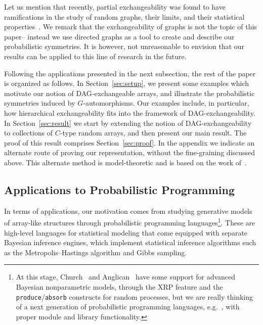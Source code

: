 \documentclass[10pt]{amsart}
\theoremstyle{definition}\newtheorem{defi}[theo]{Definition}\newtheorem{rema}[theo]{Remark}\newtheorem{exam}[theo]{Example}\newtheorem{exem}[theo]{Example}\newtheorem{nota}[theo]{Notation}
\begin{document}
Let us mention that recently, partial exchangeability was found to have ramifications in the study of random graphs, their limits, and their statistical properties~\cite{austin2008exchangeable,caicampbellbroderick2016edge, caron2017sparse, crane2018edge, diaconis2008graph, veitchroy2015sparse}. We remark that the exchangeability of graphs is not the topic of this paper-- instead we use directed graphs as a tool to create and describe our probabilistic symmetries. It is however, not unreasonable to envision that our results can be applied to this line of research in the future.



Following the applications presented in the next subsection, the rest of the paper is organized as follows. In Section~\ref{sec:setup}, we present some examples which motivate our notion of DAG-exchangeable arrays, and illustrate the probabilistic symmetries induced by $G$-automorphisms. Our examples include, in particular, how hierarchical exchangeability fits into the framework of DAG-exchangeability. In Section~\ref{sec:result} we start by extending the notion of DAG-exchangeability to collections of $C$-type random arrays, and then present our main result. The proof of this result comprises Section~\ref{sec:proof}. In the appendix we indicate an alternate route of proving our representation, without the fine-graining discussed above. This alternate method is model-theoretic and is based on the work of~\cite{crane2017relative}.



\subsection{Applications to Probabilistic Programming}\label{sec:probprog}

In terms of applications, our motivation comes from studying generative models of array-like structures through probabilistic programming languages\footnote{At this stage, Church~\cite{church2008} and Anglican~\cite{TolpinMYW16,wood-aistats-2014} have some support for advanced Bayesian nonparametric models, through the XRP feature and the \texttt{produce}/\texttt{absorb} constructs for random processes, but we are really thinking of a next generation of probabilistic programming languages, e.g.~\cite{statonetal2017pps}, with proper module and library functionality.}. These are high-level languages for statistical modeling that come equipped with separate Bayesian inference engines, which implement statistical inference algorithms such as the Metropolis--Hastings algorithm and Gibbs sampling.
\end{document}
